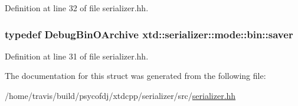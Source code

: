 Definition at line 32 of file serializer.\-hh.

\hypertarget{structxtd_1_1serializer_1_1mode_1_1bin_a796ef43a002a185030eed66012cf57fb}{
\subsubsection[{saver}]{\setlength{\rightskip}{0pt plus 5cm}typedef {\bf Debug\-Bin\-O\-Archive} {\bf xtd\-::serializer\-::mode\-::bin\-::saver}}}\label{structxtd_1_1serializer_1_1mode_1_1bin_a796ef43a002a185030eed66012cf57fb}


Definition at line 31 of file serializer.\-hh.



The documentation for this struct was generated from the following file\-:\begin{DoxyCompactItemize}
\item 
/home/travis/build/psycofdj/xtdcpp/serializer/src/\hyperlink{serializer_8hh}{serializer.\-hh}\end{DoxyCompactItemize}
